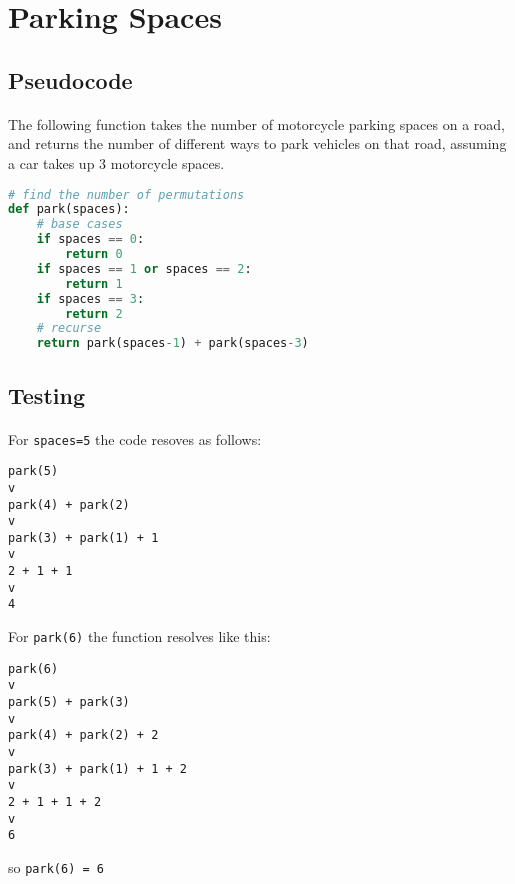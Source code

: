 \documentclass{report}
\begin{document}
\section*{Parking Spaces}
\subsection*{Pseudocode}
\paragraph{}
The following function takes the number of motorcycle parking spaces on a road, and returns the number of different ways to park vehicles on that road, assuming a car takes up 3 motorcycle spaces.

\begin{lstlisting}[language=Python]
# find the number of permutations
def park(spaces):
    # base cases
    if spaces == 0:
        return 0
    if spaces == 1 or spaces == 2:
        return 1
    if spaces == 3:
        return 2
    # recurse
    return park(spaces-1) + park(spaces-3)
\end{lstlisting}
\subsection*{Testing}
\paragraph{}
For \texttt{spaces=5} the code resoves as follows:
\begin{lstlisting}
park(5)
v
park(4) + park(2)
v
park(3) + park(1) + 1
v
2 + 1 + 1
v
4
\end{lstlisting}

For \texttt{park(6)} the function resolves like this:
\begin{lstlisting}
park(6)
v
park(5) + park(3)
v
park(4) + park(2) + 2
v
park(3) + park(1) + 1 + 2
v
2 + 1 + 1 + 2
v
6
\end{lstlisting}

so \texttt{park(6) = 6}
\end{document}

